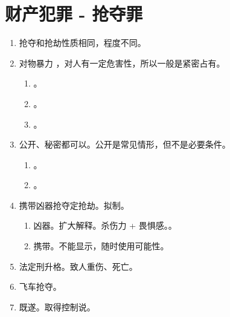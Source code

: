 \section{财产犯罪 - 抢夺罪}
\begin{enumerate}
  \item 抢夺和抢劫性质相同，程度不同。
  \item 对物暴力 ，对人有一定危害性，所以一般是紧密占有。
        \begin{enumerate}
          \item {}。
          \item {}。
          \item {}。
        \end{enumerate}
  \item 公开、秘密都可以。公开是常见情形，但不是必要条件。
        \begin{enumerate}
          \item {}。
          \item {}。
        \end{enumerate}
  \item 携带凶器抢夺定抢劫。拟制。
        \begin{enumerate}
          \item 凶器。扩大解释。杀伤力 + 畏惧感。。
          \item 携带。不能显示，随时使用可能性。
        \end{enumerate}
  \item 法定刑升格。致人重伤、死亡。
  \item 飞车抢夺。
  \item 既遂。取得控制说。
\end{enumerate}

